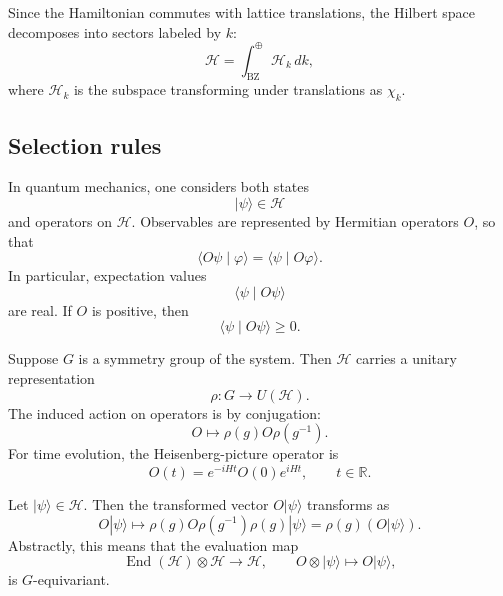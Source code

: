 {\begin{itemize}
        Since the Hamiltonian commutes with lattice translations, the Hilbert
        space decomposes into sectors labeled by \(k\):
        \[
            \mathcal{H}
            =
            \int_{\mathrm{BZ}}^{\oplus} \mathcal{H}_k\, dk,
        \]
        where \(\mathcal{H}_k\) is the subspace transforming under
        translations as \(\chi_k\).
    \end{itemize}
}

\subsection{Selection rules}

In quantum mechanics, one considers both states
\[
    |\psi\rangle \in \mathcal{H}
\]
and operators on \(\mathcal{H}\). Observables are represented by Hermitian
operators \(O\), so that
\[
    \langle O\psi \mid \varphi \rangle
    =
    \langle \psi \mid O\varphi \rangle.
\]
In particular, expectation values
\[
    \langle \psi \mid O\psi \rangle
\]
are real. If \(O\) is positive, then
\[
    \langle \psi \mid O\psi \rangle \geq 0.
\]

Suppose \(G\) is a symmetry group of the system. Then \(\mathcal{H}\) carries
a unitary representation
\[
    \rho : G \to U(\mathcal{H}).
\]
The induced action on operators is by conjugation:
\[
    O
    \longmapsto
    \rho(g) O \rho(g^{-1}).
\]
For time evolution, the Heisenberg-picture operator is
\[
    O(t)
    =
    e^{-iHt} O(0) e^{iHt},
    \qquad
    t \in \mathbb{R}.
\]

Let \(|\psi\rangle \in \mathcal{H}\). Then the transformed vector
\(O|\psi\rangle\) transforms as
\[
    O|\psi\rangle
    \longmapsto
    \rho(g)O\rho(g^{-1})\rho(g)|\psi\rangle
    =
    \rho(g)(O|\psi\rangle).
\]
Abstractly, this means that the evaluation map
\[
    \operatorname{End}(\mathcal{H}) \otimes \mathcal{H}
    \longrightarrow
    \mathcal{H},
    \qquad
    O \otimes |\psi\rangle
    \longmapsto
    O|\psi\rangle,
\]
is \(G\)-equivariant.


